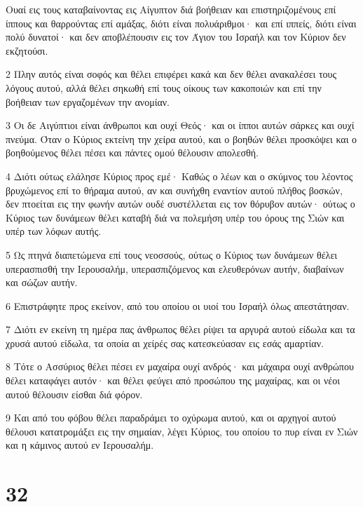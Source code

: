\par Ουαί εις τους καταβαίνοντας εις Αίγυπτον διά βοήθειαν και επιστηριζομένους επί ίππους και θαρρούντας επί αμάξας, διότι είναι πολυάριθμοι· και επί ιππείς, διότι είναι πολύ δυνατοί· και δεν αποβλέπουσιν εις τον Άγιον του Ισραήλ και τον Κύριον δεν εκζητούσι.
\par 2 Πλην αυτός είναι σοφός και θέλει επιφέρει κακά και δεν θέλει ανακαλέσει τους λόγους αυτού, αλλά θέλει σηκωθή επί τους οίκους των κακοποιών και επί την βοήθειαν των εργαζομένων την ανομίαν.
\par 3 Οι δε Αιγύπτιοι είναι άνθρωποι και ουχί Θεός· και οι ίπποι αυτών σάρκες και ουχί πνεύμα. Όταν ο Κύριος εκτείνη την χείρα αυτού, και ο βοηθών θέλει προσκόψει και ο βοηθούμενος θέλει πέσει και πάντες ομού θέλουσιν απολεσθή.
\par 4 Διότι ούτως ελάλησε Κύριος προς εμέ· Καθώς ο λέων και ο σκύμνος του λέοντος βρυχώμενος επί το θήραμα αυτού, αν και συνήχθη εναντίον αυτού πλήθος βοσκών, δεν πτοείται εις την φωνήν αυτών ουδέ συστέλλεται εις τον θόρυβον αυτών· ούτως ο Κύριος των δυνάμεων θέλει καταβή διά να πολεμήση υπέρ του όρους της Σιών και υπέρ των λόφων αυτής.
\par 5 Ως πτηνά διαπετώμενα επί τους νεοσσούς, ούτως ο Κύριος των δυνάμεων θέλει υπερασπισθή την Ιερουσαλήμ, υπερασπιζόμενος και ελευθερόνων αυτήν, διαβαίνων και σώζων αυτήν.
\par 6 Επιστράφητε προς εκείνον, από του οποίου οι υιοί του Ισραήλ όλως απεστάτησαν.
\par 7 Διότι εν εκείνη τη ημέρα πας άνθρωπος θέλει ρίψει τα αργυρά αυτού είδωλα και τα χρυσά αυτού είδωλα, τα οποία αι χείρές σας κατεσκεύασαν εις εσάς αμαρτίαν.
\par 8 Τότε ο Ασσύριος θέλει πέσει εν μαχαίρα ουχί ανδρός· και μάχαιρα ουχί ανθρώπου θέλει καταφάγει αυτόν· και θέλει φεύγει από προσώπου της μαχαίρας, και οι νέοι αυτού θέλουσιν είσθαι διά φόρον.
\par 9 Και από του φόβου θέλει παραδράμει το οχύρωμα αυτού, και οι αρχηγοί αυτού θέλουσι κατατρομάξει εις την σημαίαν, λέγει Κύριος, του οποίου το πυρ είναι εν Σιών και η κάμινος αυτού εν Ιερουσαλήμ.

\chapter{32}

